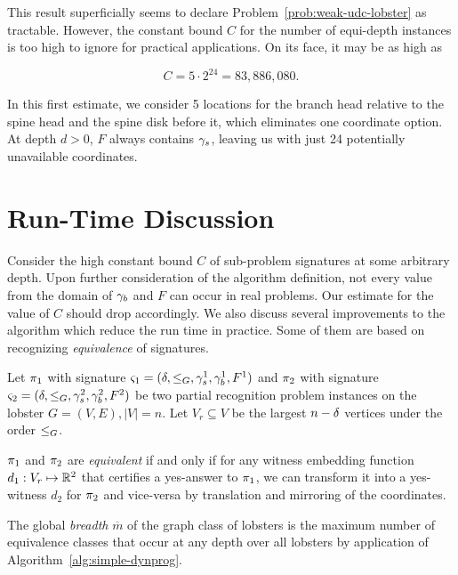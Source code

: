 This result superficially seems to declare Problem~\ref{prob:weak-udc-lobster} as tractable. However, the constant bound $C$ for the number of equi-depth instances is too high to ignore for practical applications. On its face, it may be as high as

\begin{equation*}
    C = 5 \cdot 2^{24} = 83,886,080.
\end{equation*}

In this first estimate, we consider 5 locations for the branch head relative to the spine head and the spine disk before it, which eliminates one coordinate option. At depth $d>0$, $F$ always contains $\gamma_s$, leaving us with just 24 potentially unavailable coordinates.

\section{Run-Time Discussion}

Consider the high constant bound $C$ of sub-problem signatures at some arbitrary depth. Upon further consideration of the algorithm definition, not every value from the domain of $\gamma_b$ and $F$ can occur in real problems. Our estimate for the value of $C$ should drop accordingly. We also discuss several improvements to the algorithm which reduce the run time in practice. Some of them are based on recognizing \emph{equivalence} of signatures.

Let $\pi_1$ with signature $\varsigma_1 = (\delta, \leq_G, \gamma_s^1, \gamma_b^1, F^1)$ and $\pi_2$ with signature $\varsigma_2 = (\delta, \leq_G, \gamma_s^2, \gamma_b^2, F^2)$ be two partial recognition problem instances on the lobster $G = (V, E), |V| = n$. Let $V_r \subseteq V$ be the largest $n-\delta$ vertices under the order $\leq_G$.

$\pi_1$ and $\pi_2$ are \emph{equivalent} if and only if for any witness embedding function $d_1: V_r \mapsto \mathbb R^2$ that certifies a yes-answer to $\pi_1$, we can transform it into a yes-witness $d_2$ for $\pi_2$ and vice-versa by translation and mirroring of the coordinates.

The global \emph{breadth} $\overline{m}$ of the graph class of lobsters is the maximum number of equivalence classes that occur at any depth over all lobsters by application of Algorithm~\ref{alg:simple-dynprog}.


